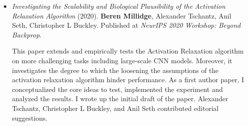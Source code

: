 \begin{itemize}
\item \emph{Investigating the Scalability and Biological Plausibility of the Activation Relaxation Algorithm} (2020). \textbf{Beren Millidge}, Alexander Tschantz, Anil Seth, Christopher L Buckley. Published at \emph{NeurIPS 2020 Workshop: Beyond Backprop}.

This paper extends and empirically tests the Activation Relaxation algorithm on more challenging tasks including large-scale CNN models. Moreover, it investigates the degree to which the loosening the assumptions of the activation relaxation algorithm hinder performance. As a first author paper, I conceptualized the core ideas to test, implemented the experiment and analyzed the results. I wrote up the initial draft of the paper. Alexander Tschantz, Christopher L Buckley, and Anil Seth contributed editorial suggestions.
\end{itemize}
